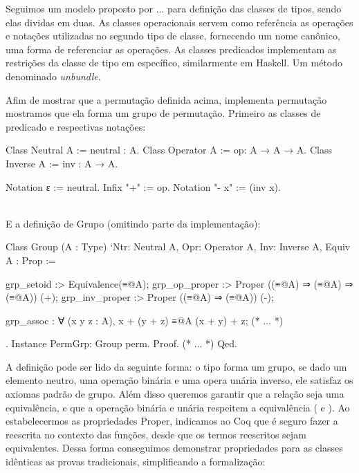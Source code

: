 Seguimos um modelo proposto por ... para definição das classes de tipos, sendo elas dividas em duas. As classes operacionais servem como referência as operações e notações utilizadas no segundo tipo de classe, fornecendo um nome canônico, uma forma de referenciar as operações. As classes predicados implementam as restrições da classe de tipo em específico, similarmente em Haskell. Um método denominado \textit{unbundle}.

Afim de mostrar que a permutação definida acima, implementa permutação mostramos que ela forma um grupo de permutação. Primeiro as classes de predicado e respectivas notações:
\vspace*{.4em}\\
\begin{minipage}[t]{0.5\linewidth}
\begin{coqcode}
Class Neutral A := neutral : A.
Class Operator A := op: A → A → A.
Class Inverse A := inv : A → A.
\end{coqcode}
\end{minipage}
\hspace{-1em}
\begin{minipage}[t]{0.5\linewidth}
\begin{coqcode}
Notation ɛ := neutral.
Infix "+" := op.
Notation "- x" := (inv x).
\end{coqcode}
\end{minipage}
\vspace*{1em}\\
E a definição de Grupo (omitindo parte da implementação):
\begin{coqcode}
Class Group (A : Type)
   `{Ntr: Neutral A, Opr: Operator A, Inv: Inverse A, Equiv A} : Prop := {
  grp_setoid :> Equivalence(≡@{A});
  grp_op_proper :> Proper ((≡@{A}) ⇒ (≡@{A}) ⇒ (≡@{A})) (+);
  grp_inv_proper :> Proper ((≡@{A}) ⇒ (≡@{A})) (-);

  grp_assoc : ∀ (x y z : A), x + (y + z) ≡@{A} (x + y) + z;
  (* ... *)
}.
Instance PermGrp: Group perm. Proof. (* ... *) Qed.
\end{coqcode}
A definição  pode ser lido da seguinte forma: o tipo  forma um grupo, se dado um elemento neutro, uma operação binária e uma opera unária inverso, ele satisfaz os axiomas padrão de grupo. Além disso queremos garantir que a relação seja uma equivalência, e que a operação binária e unária respeitem a equivalência ( e ). Ao estabelecermos as propriedades Proper, indicamos ao Coq que é seguro fazer a reescrita no contexto das funções, desde que os termos reescritos sejam equivalentes. Dessa forma conseguimos demonstrar propriedades para as classes idênticas as provas tradicionais, simplificando a formalização: 
